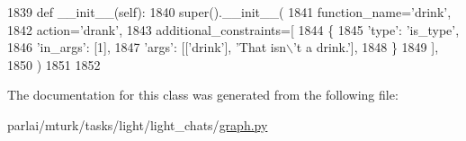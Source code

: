 \begin{DoxyCode}
1839     \textcolor{keyword}{def }\_\_init\_\_(self):
1840         super().\_\_init\_\_(
1841             function\_name=\textcolor{stringliteral}{'drink'},
1842             action=\textcolor{stringliteral}{'drank'},
1843             additional\_constraints=[
1844                 \{
1845                     \textcolor{stringliteral}{'type'}: \textcolor{stringliteral}{'is\_type'},
1846                     \textcolor{stringliteral}{'in\_args'}: [1],
1847                     \textcolor{stringliteral}{'args'}: [[\textcolor{stringliteral}{'drink'}], \textcolor{stringliteral}{'That isn\(\backslash\)'t a drink.'}],
1848                 \}
1849             ],
1850         )
1851 
1852 
\end{DoxyCode}


The documentation for this class was generated from the following file\+:\begin{DoxyCompactItemize}
\item 
parlai/mturk/tasks/light/light\+\_\+chats/\hyperlink{parlai_2mturk_2tasks_2light_2light__chats_2graph_8py}{graph.\+py}\end{DoxyCompactItemize}
